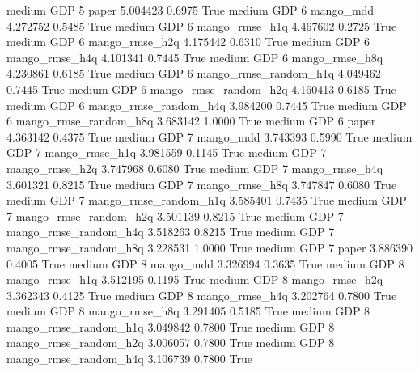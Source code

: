     medium      GDP                 5                 paper   5.004423      0.6975    True
    medium      GDP                 6             mango_mdd   4.272752      0.5485    True
    medium      GDP                 6        mango_rmse_h1q   4.467602      0.2725    True
    medium      GDP                 6        mango_rmse_h2q   4.175442      0.6310    True
    medium      GDP                 6        mango_rmse_h4q   4.101341      0.7445    True
    medium      GDP                 6        mango_rmse_h8q   4.230861      0.6185    True
    medium      GDP                 6 mango_rmse_random_h1q   4.049462      0.7445    True
    medium      GDP                 6 mango_rmse_random_h2q   4.160413      0.6185    True
    medium      GDP                 6 mango_rmse_random_h4q   3.984200      0.7445    True
    medium      GDP                 6 mango_rmse_random_h8q   3.683142      1.0000    True
    medium      GDP                 6                 paper   4.363142      0.4375    True
    medium      GDP                 7             mango_mdd   3.743393      0.5990    True
    medium      GDP                 7        mango_rmse_h1q   3.981559      0.1145    True
    medium      GDP                 7        mango_rmse_h2q   3.747968      0.6080    True
    medium      GDP                 7        mango_rmse_h4q   3.601321      0.8215    True
    medium      GDP                 7        mango_rmse_h8q   3.747847      0.6080    True
    medium      GDP                 7 mango_rmse_random_h1q   3.585401      0.7435    True
    medium      GDP                 7 mango_rmse_random_h2q   3.501139      0.8215    True
    medium      GDP                 7 mango_rmse_random_h4q   3.518263      0.8215    True
    medium      GDP                 7 mango_rmse_random_h8q   3.228531      1.0000    True
    medium      GDP                 7                 paper   3.886390      0.4005    True
    medium      GDP                 8             mango_mdd   3.326994      0.3635    True
    medium      GDP                 8        mango_rmse_h1q   3.512195      0.1195    True
    medium      GDP                 8        mango_rmse_h2q   3.362343      0.4125    True
    medium      GDP                 8        mango_rmse_h4q   3.202764      0.7800    True
    medium      GDP                 8        mango_rmse_h8q   3.291405      0.5185    True
    medium      GDP                 8 mango_rmse_random_h1q   3.049842      0.7800    True
    medium      GDP                 8 mango_rmse_random_h2q   3.006057      0.7800    True
    medium      GDP                 8 mango_rmse_random_h4q   3.106739      0.7800    True
